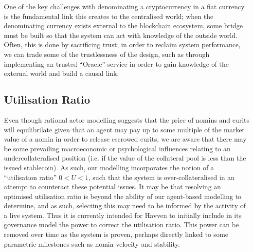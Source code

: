 One of the key challenges with denominating a cryptocurrency in a fiat currency is the fundamental link this creates to the centralised world; when the denominating currency exists external to the blockchain ecosystem, some bridge must be built so that the system can act with knowledge of the outside world. Often, this is done by sacrificing trust; in order to reclaim system performance, we can trade some of the trustlessness of the design, such as through implementing an trusted ``Oracle'' service in order to gain knowledge of the external world and build a causal link.



\subsection{Utilisation Ratio} Even though rational actor modelling suggests that the price of nomins and curits will equilibrilate
given that an agent may pay up to some multiple of the market value of a nomin in order to release escrowed curits, we are aware that there may be some
prevailing macroeconomic or psychological influences relating to an undercollateralised position
(i.e. if the value of the collateral pool is less than the issued stablecoin). As such, our modelling incorporates the notion of a ``utilisation ratio''
\(0 < U < 1\), such that the system is over-collateralised in an attempt to counteract these potential issues. It may be that resolving an
optimised utilisation ratio is beyond the ability of our agent-based modelling to determine, and as such, selecting this may need to be
informed by the activity of a live system. Thus it is currently intended for Havven to initially include in its governance model the power
to correct the utilisation ratio. This power can be removed over time as the system is proven, perhaps directly linked to some parametric milestones such as nomin velocity and stability.


\pagebreak